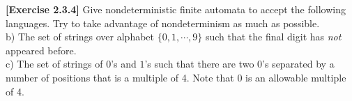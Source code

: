 \textbf{[Exercise 2.3.4]} Give nondeterministic finite automata to accept the following
languages. Try to take advantage of nondeterminism as much as possible.\\
b) The set of strings over alphabet $\{0,1,\cdots,9\}$ such that the final digit has
\textit{not} appeared before.\\
c) The set of strings of $0$'s and $1$'s such that there are two $0$'s separated by a 
number of positions that is a multiple of 4. Note that $0$ is an allowable multiple of
4.
